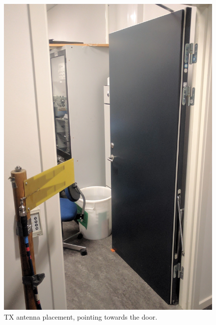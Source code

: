 \begin{figure}[H]
  \centering
  \begin{minipage}[H]{0.42\textwidth}
    \includegraphics[width=\textwidth]{pictures/Measurement/antenna_door.jpg}
    \caption{TX antenna placement, pointing towards the door.}
    \label{antennadoor}
  \end{minipage}
  \hfill
  \begin{minipage}[H]{0.4\textwidth}

\end{minipage}
\end{figure}
